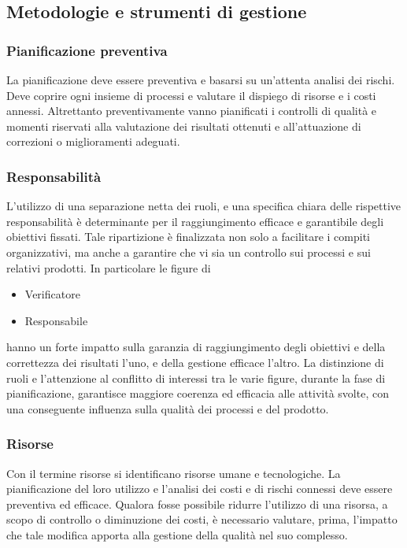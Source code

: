 \documentclass[12pt,a4paper]{article}
\begin{document}
\subsection{Metodologie e strumenti di gestione}
\subsubsection{Pianificazione preventiva}
La pianificazione deve essere preventiva e basarsi su un'attenta analisi dei rischi. Deve coprire ogni insieme di processi e valutare il dispiego di risorse e i costi annessi. 
Altrettanto preventivamente vanno pianificati i controlli di qualità e momenti riservati alla valutazione dei risultati ottenuti e all'attuazione di correzioni o miglioramenti adeguati.

\subsubsection{Responsabilità}
L'utilizzo di una separazione netta dei ruoli, e una specifica chiara delle rispettive responsabilità è determinante per il raggiungimento efficace e garantibile degli obiettivi fissati.
Tale ripartizione è finalizzata non solo a facilitare i compiti organizzativi, ma anche a garantire che vi sia un controllo sui processi e sui relativi prodotti.
In particolare le figure di
\begin{itemize}
	\item Verificatore
	\item Responsabile
\end{itemize}
hanno un forte impatto sulla garanzia di raggiungimento degli obiettivi e della correttezza dei risultati l'uno, e della gestione efficace l'altro.
La distinzione di ruoli e l'attenzione al conflitto di interessi tra le varie figure, durante la fase di pianificazione, garantisce maggiore coerenza ed efficacia alle attività svolte, con una conseguente influenza sulla qualità dei  processi e del prodotto.


\subsubsection{Risorse}\label{risorse}
Con il termine risorse si identificano risorse umane e tecnologiche. La pianificazione del loro utilizzo e l'analisi dei costi e di rischi connessi deve essere preventiva ed efficace.
Qualora fosse possibile ridurre l'utilizzo di una risorsa, a scopo di controllo o diminuzione dei costi, è necessario valutare, prima, l'impatto che tale modifica apporta alla gestione della qualità nel suo complesso.
\end{document}
